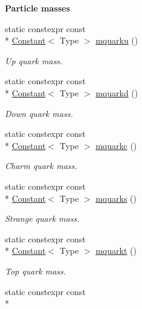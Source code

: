 \begin{Indent}{\bf Particle masses}\par
\begin{DoxyCompactItemize}
\item 
static constexpr const \\*
\hyperlink{exceptionmagrathea_1_1Constant}{Constant}$<$ Type $>$ \hyperlink{exceptionmagrathea_1_1Constants_a9550edf4a9efe38ea81b4fef7f32de46}{mquarku} ()
\begin{DoxyCompactList}\small\item\em Up quark mass. \end{DoxyCompactList}\item 
static constexpr const \\*
\hyperlink{exceptionmagrathea_1_1Constant}{Constant}$<$ Type $>$ \hyperlink{exceptionmagrathea_1_1Constants_a9b0e61f5547b364287a322208213ae45}{mquarkd} ()
\begin{DoxyCompactList}\small\item\em Down quark mass. \end{DoxyCompactList}\item 
static constexpr const \\*
\hyperlink{exceptionmagrathea_1_1Constant}{Constant}$<$ Type $>$ \hyperlink{exceptionmagrathea_1_1Constants_a35467f8adbd13a07a193cf7257ff63a0}{mquarkc} ()
\begin{DoxyCompactList}\small\item\em Charm quark mass. \end{DoxyCompactList}\item 
static constexpr const \\*
\hyperlink{exceptionmagrathea_1_1Constant}{Constant}$<$ Type $>$ \hyperlink{exceptionmagrathea_1_1Constants_a8133911a3b61f300955170177c994cce}{mquarks} ()
\begin{DoxyCompactList}\small\item\em Strange quark mass. \end{DoxyCompactList}\item 
static constexpr const \\*
\hyperlink{exceptionmagrathea_1_1Constant}{Constant}$<$ Type $>$ \hyperlink{exceptionmagrathea_1_1Constants_acf226285b2bc073122876e5afd0ba12c}{mquarkt} ()
\begin{DoxyCompactList}\small\item\em Top quark mass. \end{DoxyCompactList}\item 
static constexpr const \\*

\end{DoxyCompactItemize}
\end{Indent}
